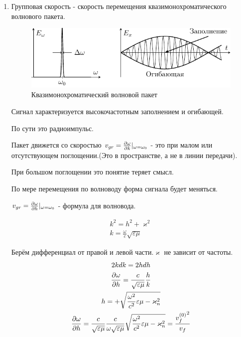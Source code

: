 \documentclass[a4paper,14pt]{extarticle}
\renewcommand{\kappa}{\varkappa}
\begin{document}
\begin{enumerate}
	\item Групповая скорость - скорость перемещения квазимонохроматического волнового пакета. 	
	\begin{figure}[h!]
		\centering
		\includegraphics[scale=1]{img/lect3_ris8}
		\caption{Квазимонохроматический волновой пакет}
		\label{fig:lect3:8}
	\end{figure}
	
	Сигнал характеризуется высокочастотным заполнением и огибающей.
	
	По сути это радиоимпульс.
	
	Пакет движется со скоростью $ v_{gr} = \pdv{\omega}{k}\vert_{\omega = \omega_{0}} $ - это при малом или отсутствующем поглощении.(Это в пространстве, а не в линии передачи).
	
	При большом поглощении это понятие теряет смысл.
	
	По мере перемещения по волноводу форма сигнала будет меняться.
	
	$v_{gr} = \pdv{\omega}{h}\vert_{\omega = \omega_{0}} $ - формула для волновода. 
	
	\begin{gather}
	k^2 = h^2 + \kappa^2\\
	k = \frac{\omega}{c} \sqrt{ \varepsilon \mu}
	\end{gather}
	
	Берём дифференциал от правой и левой части.$\kappa$  не зависит от частоты.
	\begin{gather*}
	2k dk = 2h dh\\
	\pdv{\omega}{h} = \frac{c}{\sqrt{\varepsilon \mu}} \frac{h}{k}\\
	h = + \sqrt{\frac{\omega^2}{c^2} \varepsilon \mu -\kappa^2_n}\\
	\pdv{\omega}{h} = \frac{c}{\sqrt{\varepsilon \mu}} \frac{c}{\omega \sqrt{\varepsilon \mu}} \sqrt{\frac{\omega^2}{c^2} \varepsilon \mu -\kappa^2_n} = \frac{{v_f^{(0)}}^2}{v_f}
	\end{gather*}
	

\end{enumerate}
\end{document}
